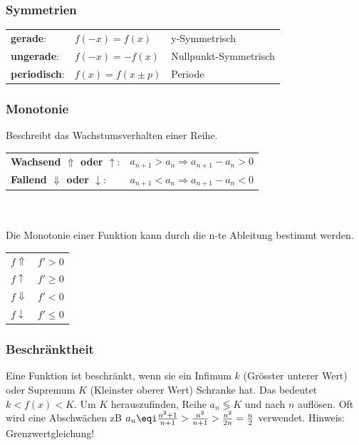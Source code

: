 \subsubsection{Symmetrien}
\begin{tabular}{lll}
	\textbf{gerade}:& $f(-x) = f(x)$ & y-Symmetrisch\\
	\textbf{ungerade}:& $f(-x) = -f(x)$ & Nullpunkt-Symmetrisch\\
	\textbf{periodisch}:& $f(x) = f(x \pm p)$& Periode \\
\end{tabular}

\subsubsection{Monotonie}\label{monotonie}
Beschreibt das Wachstumsverhalten einer Reihe.\\
\noindent
\begin{tabular}{ll}
	\textbf{Wachsend $\Uparrow$ oder $\uparrow$}:& $a_{n+1} > a_n \Rightarrow a_{n+1} - a_n > 0$\\
	\textbf{Fallend $\Downarrow$ oder $\downarrow$}:& $a_{n+1} < a_n \Rightarrow a_{n+1} - a_n < 0$\\
\end{tabular}\\ \\

\noindent Die Monotonie einer Funktion kann durch die n-te Ableitung bestimmt werden.\\
\noindent\begin{tabular}{ll}
	$f \Uparrow$ & $f' > 0$\\
	$f \uparrow$ & $f' \geq 0$\\
	$f \Downarrow$ & $f' < 0$\\
	$f \downarrow$ & $f' \leq 0$\\
\end{tabular}

\subsubsection{Beschränktheit}\label{beschränkt}
Eine Funktion ist beschränkt, wenn sie ein Infimum $k$ (Grösster unterer Wert) oder Supremum $K$ (Kleinster oberer Wert) Schranke hat. Das bedeutet $k < f(x) < K$. Um $K$ herauszufinden, Reihe $a_n \lessgtr K$ und nach $n$ auflösen. Oft wird eine Abschwächen zB $a_n \eqi \frac{n^2+1}{n+1} > \frac{n^2}{n+1} > \frac{n^2}{2n} = \frac{n}{2}$ verwendet. Hinweis: Grenzwertgleichung!

